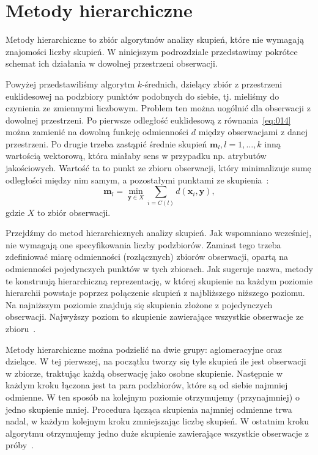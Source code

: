 \documentclass{praca1}
\begin{document}
\section{Metody hierarchiczne}

Metody hierarchiczne to zbiór algorytmów analizy skupień, które nie wymagają znajomości liczby skupień. W niniejszym podrozdziale przedstawimy pokrótce schemat ich działania w dowolnej przestrzeni obserwacji.

Powyżej przedstawiliśmy algorytm $k$-średnich, dzielący zbiór z przestrzeni euklidesowej na podzbiory punktów podobnych do siebie, tj. mieliśmy do czynienia ze zmiennymi liczbowym. Problem ten można uogólnić dla obserwacji z dowolnej przestrzeni. Po pierwsze odległość euklidesową z równania~\ref{eq:014} można zamienić na dowolną funkcję odmienności $d$ między obserwacjami z danej przestrzeni. Po drugie trzeba zastąpić średnie skupień $\mathbf{m}_l, l=1,\ldots,k$ inną wartością wektorową, która miałaby sens w przypadku np. atrybutów jakościowych. Wartość ta to punkt ze zbioru obserwacji, który minimalizuje sumę odległości między nim samym, a pozostałymi punktami ze skupienia~\cite{Koronacki2005:statystyczne}:
\begin{equation}
\mathbf{m}_l = \min\limits_{\mathbf{y} \in X} \sum\limits_{i = C(l)} d(\mathbf{x}_i, \mathbf{y}),
\end{equation}
gdzie $X$ to zbiór obserwacji.

Przejdźmy do metod hierarchicznych analizy skupień. Jak wspomniano wcześniej, nie wymagają one specyfikowania liczby podzbiorów. Zamiast tego trzeba zdefiniować miarę odmienności (rozłącznych) zbiorów obserwacji, opartą na odmienności pojedynczych punktów w tych zbiorach. Jak sugeruje nazwa, metody te konstruują hierarchiczną reprezentację, w której skupienie na każdym poziomie hierarchii powstaje poprzez połączenie skupień z najbliższego niższego poziomu. Na najniższym poziomie znajdują się skupienia złożone z pojedynczych obserwacji. Najwyższy poziom to skupienie zawierające wszystkie obserwacje ze zbioru~\cite{Hastie2009:elements}.

Metody hierarchiczne można podzielić na dwie grupy: aglomeracyjne oraz dzielące. W tej pierwszej, na początku tworzy się tyle skupień ile jest obserwacji w zbiorze, traktując każdą obserwację jako osobne skupienie. Następnie w każdym kroku łączona jest ta para podzbiorów, które są od siebie najmniej odmienne. W ten sposób na kolejnym poziomie otrzymujemy (przynajmniej) o jedno skupienie mniej. Procedura łącząca skupienia najmniej odmienne trwa nadal, w każdym kolejnym kroku zmniejszając liczbę skupień. W ostatnim kroku algorytmu otrzymujemy jedno duże skupienie zawierające wszystkie obserwacje z próby~\cite{Hastie2009:elements, Koronacki2005:statystyczne}.
\end{document}

